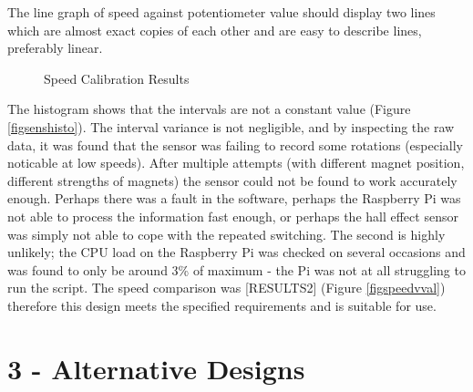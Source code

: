 \documentclass[twoside,a4]{report}
\def\br{\newline \newline \noindent}
\def\rpi{Raspberry Pi }
\begin{document}
The line graph of speed against potentiometer value should display two lines which are almost exact copies of each other and are easy to describe lines, preferably linear.\br
	\begin{figure}[!htb]
		\centering
		\label{fig2speeds}
		\caption{Speed Calibration Results}
	\end{figure} \newline  \noindent
	The histogram shows that the intervals are not a constant value (Figure \ref{figsenshisto}). The interval variance is not negligible, and by inspecting the raw data, it was found that the sensor was failing to record some rotations (especially noticable at low speeds). After multiple attempts (with different magnet position, different strengths of magnets) the sensor could not be found to work accurately enough. Perhaps there was a fault in the software, perhaps the \rpi was not able to process the information fast enough, or perhaps the hall effect sensor was simply not able to cope with the repeated switching. The second is highly unlikely; the CPU load on the \rpi was checked on several occasions and was found to only be around 3\% of maximum - the Pi was not at all struggling to run the script.\br
	The speed comparison was [RESULTS2] (Figure \ref{figspeedvval}) therefore this design meets the specified requirements and is suitable for use.
\section{3 - Alternative Designs}
\end{document}
